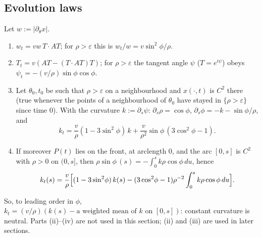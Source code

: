 \subsection{Evolution laws}

\begin{lemma}\label{lem:B-1}
Let $w:=|\partial_\theta x|$.
\begin{enumerate}
\item[(i)] $w_t=vw\,T\cdot AT$; for $\rho>\varepsilon$ this is $w_t/w=v\sin^2\!\phi/\rho$.
\item[(ii)] $T_t=v(AT-(T\cdot AT)T)$; for $\rho>\varepsilon$ the tangent angle $\psi$ ($T=e^{i\psi}$) obeys
$\psi_t=-(v/\rho)\sin\phi\cos\phi$.
\item[(iii)] Let $\theta_0,t_0$ be such that $\rho>\varepsilon$ on a neighbourhood and $x(\cdot,t)$ is $C^2$ there (true whenever the
points of a neighbourhood of $\theta_0$ have stayed in $\{\rho>\varepsilon\}$ since time $0$). With the curvature $k:=\partial_s\psi$:
$\partial_s\rho=\cos\phi$, $\partial_s\phi=-k-\sin\phi/\rho$, and
\[
k_t=\frac v\rho(1-3\sin^2\!\phi)\,k+\frac v{\rho^2}\sin\phi\,(3\cos^2\!\phi-1).
\]
\item[(iv)] If moreover $P(t)$ lies on the front, at arclength $0$, and the arc $[0,s]$ is $C^2$ with $\rho>0$ on $(0,s]$, then
$\rho\sin\phi\,(s)=-\int_0^sk\rho\cos\phi\,du$, hence
\[
k_t(s)=\frac v\rho\Bigl[(1-3\sin^2\!\phi)\,k(s)-(3\cos^2\!\phi-1)\rho^{-2}\int_0^sk\rho\cos\phi\,du\Bigr].
\]
\end{enumerate}
\end{lemma}
So, to leading order in $\phi$, $k_t=(v/\rho)(k(s)-\text{a weighted mean of $k$ on }[0,s])$: constant curvature is neutral. Parts
(ii)--(iv) are not used in this section; (ii) and (iii) are used in later sections.

